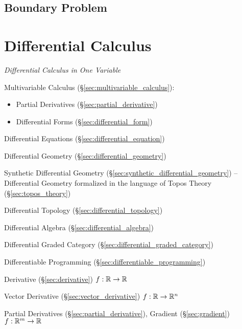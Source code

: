 
\subsection{Boundary Problem}\label{sec:boundary_problem}




\section{Differential Calculus}\label{sec:differential_calculus}

\emph{Differential Calculus in One Variable}

\fist Multivariable Calculus (\S\ref{sec:multivariable_calculus}):
\begin{itemize}
  \item Partial Derivatives (\S\ref{sec:partial_derivative})
  \item Differential Forms (\S\ref{sec:differential_form})
\end{itemize}

\fist Differential Equations (\S\ref{sec:differential_equation})

\fist Differential Geometry (\S\ref{sec:differential_geometry})

\fist Synthetic Differential Geometry
(\S\ref{sec:synthetic_differential_geometry}) --
Differential Geometry formalized in the language of Topos Theory
(\S\ref{sec:topos_theory})

\fist Differential Topology (\S\ref{sec:differential_topology})

\fist Differential Algebra (\S\ref{sec:differential_algebra})

\fist Differential Graded Category (\S\ref{sec:differential_graded_category})

\fist Differentiable Programming (\S\ref{sec:differentiable_programming})

Derivative (\S\ref{sec:derivative}) $f : \mathbb{R} \rightarrow \mathbb{R}$

Vector Derivative (\S\ref{sec:vector_derivative})
$f : \mathbb{R} \rightarrow \mathbb{R}^n$

Partial Derivatives (\S\ref{sec:partial_derivative}), Gradient
(\S\ref{sec:gradient}) $f : \mathbb{R}^m \rightarrow \mathbb{R}$

